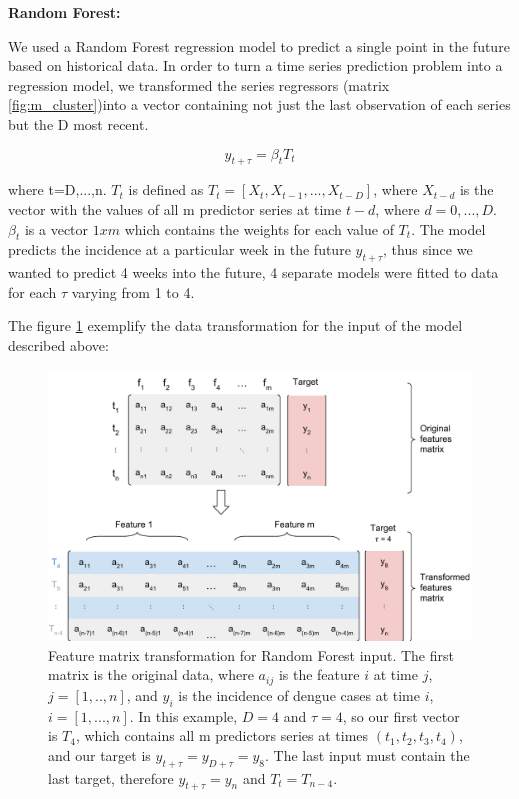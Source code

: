 \documentclass[12pt]{report}
\begin{document}
\begin{description}
 \item \textbf{Random Forest:}
 
 We used a Random Forest regression model to predict a single point in the future based on historical data. In order to turn a time series prediction problem into a regression model, we transformed the series regressors (matrix \ref{fig:m_cluster})into a vector containing not just the last observation of each series but the {\cal D} most recent.

\begin{equation}
y_{t+\tau} = \beta_{t} T_{t}
\label{eq:rf_trans}
\end{equation} 

where t=D,...,n. $T_t$ is defined as $T_t = [X_{t},X_{t-1},...,X_{t-D}]$, where $X_{t-d}$ is the vector with the values of all m predictor series at time $t-d$, where $d=0,...,D$.
$\beta_t$ is a vector $1 x m$ which contains the weights for each value of $T_t$.
The model predicts the incidence at a particular week in the future $y_{t+\tau}$, thus since we wanted to predict 4 weeks into the future, 4 separate models were fitted to data for each $\tau$ varying from 1 to 4.

The figure \ref{fig:rf_matrix} exemplify the data transformation for the input of the model described above:

 \begin{figure}[h!]
 \includegraphics[scale=0.8]{rf_features.pdf}
 \caption{Feature matrix transformation for Random Forest input. The first matrix is the original data, where $a_{ij}$ is the feature $i$ at time $j$, $j=[1,..,n]$, and $y_i$ is the incidence of dengue cases at time $i$, $i=[1,...,n]$. In this example, $D=4$ and $\tau=4$, so our first vector is $T_4$, which contains all m predictors series at times $(t_1,t_2,t_3,t_4)$, and our target is $y_{t+\tau} = y_{D+\tau} = y_{8}$. The last input must contain the last target, therefore $y_{t+\tau} = y_n$ and $T_t = T_{n-4}$.}
 \label{fig:rf_matrix}
\end{figure}


\end{description}
\end{document}
